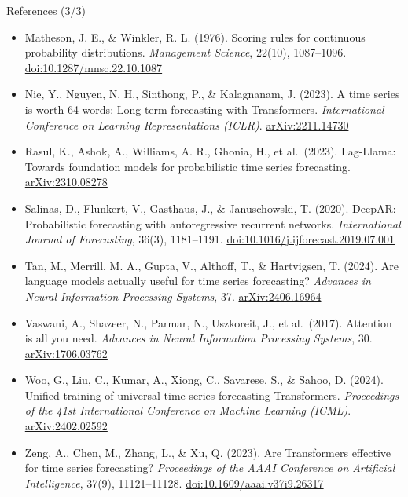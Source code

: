 \begin{frame}{References (3/3)}
\itemsize{\scriptsize}
\begin{itemize}
    \item Matheson, J. E., \& Winkler, R. L. (1976). Scoring rules for continuous probability distributions. \textit{Management Science}, 22(10), 1087--1096. \href{https://doi.org/10.1287/mnsc.22.10.1087}{doi:10.1287/mnsc.22.10.1087}
    \item Nie, Y., Nguyen, N. H., Sinthong, P., \& Kalagnanam, J. (2023). A time series is worth 64 words: Long-term forecasting with Transformers. \textit{International Conference on Learning Representations (ICLR)}. \href{https://arxiv.org/abs/2211.14730}{arXiv:2211.14730}
    \item Rasul, K., Ashok, A., Williams, A. R., Ghonia, H., et al.\ (2023). Lag-Llama: Towards foundation models for probabilistic time series forecasting. \href{https://arxiv.org/abs/2310.08278}{arXiv:2310.08278}
    \item Salinas, D., Flunkert, V., Gasthaus, J., \& Januschowski, T. (2020). DeepAR: Probabilistic forecasting with autoregressive recurrent networks. \textit{International Journal of Forecasting}, 36(3), 1181--1191. \href{https://doi.org/10.1016/j.ijforecast.2019.07.001}{doi:10.1016/j.ijforecast.2019.07.001}
    \item Tan, M., Merrill, M. A., Gupta, V., Althoff, T., \& Hartvigsen, T. (2024). Are language models actually useful for time series forecasting? \textit{Advances in Neural Information Processing Systems}, 37. \href{https://arxiv.org/abs/2406.16964}{arXiv:2406.16964}
    \item Vaswani, A., Shazeer, N., Parmar, N., Uszkoreit, J., et al.\ (2017). Attention is all you need. \textit{Advances in Neural Information Processing Systems}, 30. \href{https://arxiv.org/abs/1706.03762}{arXiv:1706.03762}
    \item Woo, G., Liu, C., Kumar, A., Xiong, C., Savarese, S., \& Sahoo, D. (2024). Unified training of universal time series forecasting Transformers. \textit{Proceedings of the 41st International Conference on Machine Learning (ICML)}. \href{https://arxiv.org/abs/2402.02592}{arXiv:2402.02592}
    \item Zeng, A., Chen, M., Zhang, L., \& Xu, Q. (2023). Are Transformers effective for time series forecasting? \textit{Proceedings of the AAAI Conference on Artificial Intelligence}, 37(9), 11121--11128. \href{https://doi.org/10.1609/aaai.v37i9.26317}{doi:10.1609/aaai.v37i9.26317}
\end{itemize}
\end{frame}


